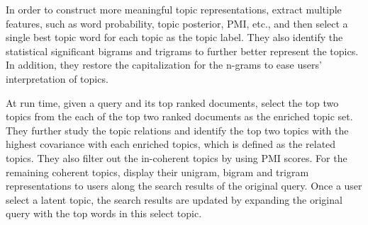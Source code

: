 In order to construct more meaningful topic representations, \cite{Andrzejewski-2011} extract multiple features, such as word probability, topic posterior, PMI, etc., and then select a single best topic word for each topic as the topic label. They also identify the statistical significant bigrams and trigrams to further better represent the topics. In addition, they restore the capitalization for the n-grams to ease users' interpretation of topics. 

At run time, given a query and its top ranked documents, \cite{Andrzejewski-2011} select the top two topics from the each of the top two ranked documents as the enriched topic set. They further study the topic relations and identify the top two topics with the highest covariance with each enriched topics, which is defined as the related topics. They also filter out the in-coherent topics by using PMI scores. For the remaining coherent topics, \cite{Andrzejewski-2011} display their unigram, bigram and trigram representations to users along the search results of the original query. Once a user select a latent topic, the search results are updated by expanding the original query with the top words in this select topic. 





